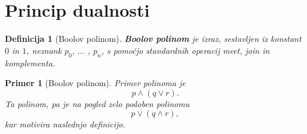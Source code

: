 \documentclass{amsart}
\newtheorem{definicija}[izrek]{Definicija}
\newtheorem{primer}[izrek]{Primer}
\begin{document}
\section{Princip dualnosti}

\begin{definicija}[Boolov polinom]
    {\bf Boolov polinom} je izraz, sestavljen iz konstant \(0\) in \(1\), neznank \(p_0\), \(\ldots\) , \(p_n\), s pomočjo standardnih operacij
    meet, join in komplementa.
\end{definicija}

\begin{primer}[Boolov polinom]
    Primer polinoma je
    \[p \wedge (q \vee r).\]
    Ta polinom, pa je na pogled zelo podoben polinomu
    \[p \vee (q \wedge r),\]
    kar motivira naslednjo definicijo.
\end{primer}
\end{document}

